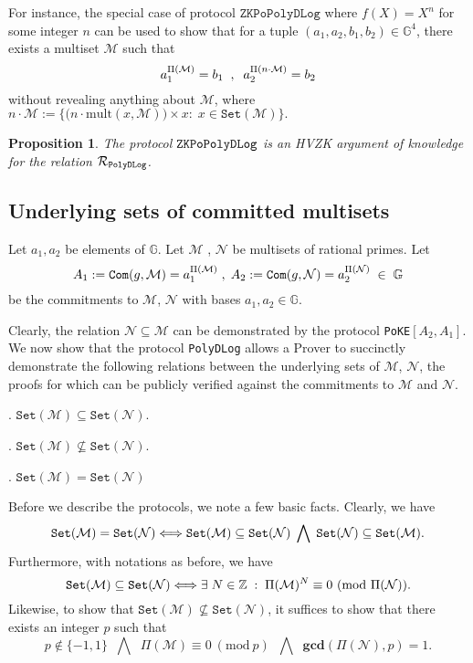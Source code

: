 \documentclass[11pt, lettersize, notitlepage, leqno, footskip=0.6cm]{article}
\newcommand{\bz}{\mathbb Z}
\newcommand{\ttt}{\texttt}
\newcommand{\bG}{\mathbb{G}}
\newcommand{\sett}{\ttt{Set}}
\newcommand{\mult}{\mr{mult}}
\newcommand{\LRA}{\Longleftrightarrow}
\newcommand{\mc}{\mathcal}
\newcommand{\mb}{\mathbb}
\newcommand{\mbf}{\mathbf}
\newcommand{\mr}{\mathrm}
\newcommand{\sub}{\subseteq}
\newcommand{\nsub}{\nsubseteq}
\newcommand{\mcM}{\mc{M}}
\newcommand{\vs}{\vspace{-0.15cm}}
\newcommand{\noin}{\noindent}
\newcommand{\Mod}[1]{\ (\mathrm{mod}\ #1)}
\newcommand{\GCD}{\mbf{gcd}}
\newtheorem{Prop}[Thm]{Proposition}
\numberwithin{equation}{section}
\begin{document}
For instance, the special case of protocol $\ttt{ZKPoPolyDLog}$ where $f(X) = X^n$ for some integer $n$ can be used to show that for a tuple $(a_1, a_2, b_1, b_2)\in \mb{G}^4$, there exists a multiset $\mcM$ such that \vs $$ a_1^{\Pi(\mcM)} = b_1\;\;,\;\; a_2^{\Pi(n\cdot\mcM)} = b_2   \vs $$ without revealing anything about $\mcM$, where $n\cdot\mcM:= \big\{\big(n\cdot \mult(x, \mcM)\big)\times x:\; x\in \sett({\mcM})\big\}.$


\begin{Prop} The protocol $\tt{ZKPoPolyDLog}$ is an HVZK argument of knowledge for the relation $\mc{R}_{\tt{PolyDLog}}$.\end{Prop}

\begin{prf} \end{prf}






\subsection{\fontsize{11}{11}\selectfont Underlying sets of committed multisets}

\noin \hypertarget{Sets}{Let $a_1,a_2$ be elements of $\mb{G}$. Let $\mc{M}$ , $\mc{N}$ be multisets of rational primes.} Let \vs $$A_1:= \ttt{Com}(g, \mc{M}) =  a_1^{\Pi(\mc{M})}\;,\; A_2:= \ttt{Com}(g, \mc{N}) = a_2^{\Pi(\mc{N})}\;\in\;\bG \vs $$ be the commitments to $\mc{M}$, $\mc{N}$ with bases $a_1, a_2\in \bG$.

Clearly, the relation $\mc{N}\sub \mc{M}$ can be demonstrated by the protocol \verb|PoKE|$[A_2, A_1]$. We now show that the protocol \verb|PolyDLog| allows a Prover to succinctly demonstrate the following relations between the underlying sets of $\mc{M}$, $\mc{N}$, the proofs for which can be publicly verified against the commitments to $\mc{M}$ and $\mc{N}$.\vspace{0.1cm}

\noin 1. $\sett(\mc{M})\sub \sett(\mc{N})$.

\noin 2. $\sett(\mc{M})\nsub \sett(\mc{N})$.

\noin 3. $\sett(\mc{M}) = \sett(\mc{N})$ \vspace{0.1cm}

\noin Before we describe the protocols, we note a few basic facts. Clearly, we have \vs $$\sett(\mc{M}) = \sett(\mc{N})\LRA \sett(\mc{M}) \sub \sett(\mc{N})\;\bigwedge\; \sett(\mc{N}) \sub \sett(\mc{M}). \vs $$ Furthermore, with notations as before, we have \vs $$\sett(\mc{M})\sub \sett(\mc{N})\LRA \exists\; N\in\bz\;:\;\Pi(\mc{M})^N\equiv 0\Mod{\Pi(\mc{N})}.\vs $$ Likewise, to show that $\sett(\mc{M})\nsub \sett(\mc{N})$, it suffices to show that there exists an integer $p$ such that \vs $$p\notin \{-1,1\}   \;\;\bigwedge\;\;\Pi(\mc{M})\equiv 0\Mod{p} \;\;\bigwedge\;\; \GCD(\Pi(\mc{N}),{p})=1.$$
\end{document}
